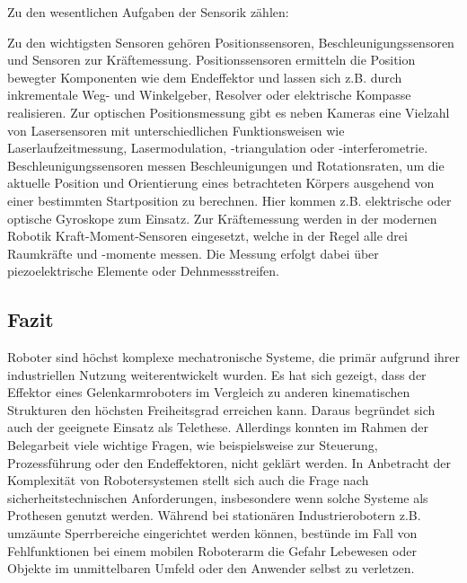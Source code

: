 \documentclass[11pt,ngerman,parskip=half]{scrartcl}
\begin{document}
Zu den wesentlichen Aufgaben der Sensorik zählen:

Zu den wichtigsten Sensoren gehören Positionssensoren,
Beschleunigungssensoren und Sensoren zur Kräftemessung. Positionssensoren
ermitteln die Position bewegter Komponenten wie dem Endeffektor und lassen sich
z.B. durch inkrementale Weg- und Winkelgeber, Resolver oder elektrische Kompasse
realisieren. Zur optischen Positionsmessung gibt es neben Kameras eine Vielzahl 
von Lasersensoren mit unterschiedlichen Funktionsweisen wie
Laserlaufzeitmessung, Lasermodulation, -triangulation oder -interferometrie.
Beschleunigungssensoren messen Beschleunigungen und Rotationsraten, um die
aktuelle Position und Orientierung eines betrachteten Körpers ausgehend von
einer bestimmten Startposition zu berechnen. Hier kommen z.B. elektrische
oder optische Gyroskope zum Einsatz. Zur Kräftemessung werden in der modernen
Robotik Kraft-Moment-Sensoren eingesetzt, welche in der Regel alle drei
Raumkräfte und -momente messen. Die Messung erfolgt dabei über
piezoelektrische Elemente oder Dehnmessstreifen.
\parencite[vgl.][98--117]{hesse_taschenbuch_2016}

\subsection{Fazit}
\label{subsec:Fazit}
Roboter sind höchst komplexe mechatronische Systeme, die primär aufgrund
ihrer industriellen Nutzung weiterentwickelt wurden. Es hat sich gezeigt,
dass der Effektor eines Gelenkarmroboters im Vergleich zu anderen
kinematischen Strukturen den höchsten Freiheitsgrad erreichen kann. Daraus
begründet sich auch der geeignete Einsatz als Telethese. Allerdings konnten
im Rahmen der Belegarbeit viele wichtige Fragen, wie beispielsweise zur
Steuerung, Prozessführung oder den Endeffektoren, nicht geklärt werden. In
Anbetracht der Komplexität von Robotersystemen stellt sich auch die Frage
nach sicherheitstechnischen Anforderungen, insbesondere wenn solche Systeme
als Prothesen genutzt werden. Während bei stationären Industrierobotern z.B.
umzäunte Sperrbereiche eingerichtet werden können, bestünde im Fall von
Fehlfunktionen bei einem mobilen Roboterarm die Gefahr Lebewesen oder Objekte
im unmittelbaren Umfeld oder den Anwender selbst zu verletzen.

\newpage
\printbibliography[heading=bibintoc]
\end{document}
